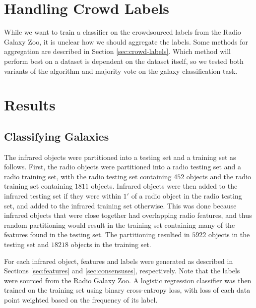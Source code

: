 \section{Handling Crowd Labels}
\label{sec:rgz-crowd-labels}

  While we want to train a classifier on the crowdsourced labels from the Radio Galaxy Zoo, it is unclear how we should aggregate the labels. Some methods for aggregation are described in Section \ref{sec:crowd-labels}. Which method will perform best on a dataset is dependent on the dataset itself, so we tested both variants of the \citeauthor{raykar10} algorithm and majority vote on the galaxy classification task.


\section{Results}
\label{sec:rgz-results}
  
  \subsection{Classifying Galaxies}


    The infrared objects were partitioned into a testing set and a training set as follows. First, the radio objects were partitioned into a radio testing set and a radio training set, with the radio testing set containing $452$ objects and the radio training set containing $1811$ objects. Infrared objects were then added to the infrared testing set if they were within $1'$ of a radio object in the radio testing set, and added to the infrared training set otherwise. This was done because infrared objects that were close together had overlapping radio features, and thus random partitioning would result in the training set containing many of the features found in the testing set. The partitioning resulted in $5922$ objects in the testing set and $18218$ objects in the training set.

    For each infrared object, features and labels were generated as described in Sections \ref{sec:features} and \ref{sec:consensuses}, respectively. Note that the labels were sourced from the Radio Galaxy Zoo. A logistic regression classifier was then trained on the training set using binary cross-entropy loss, with loss of each data point weighted based on the frequency of its label.

